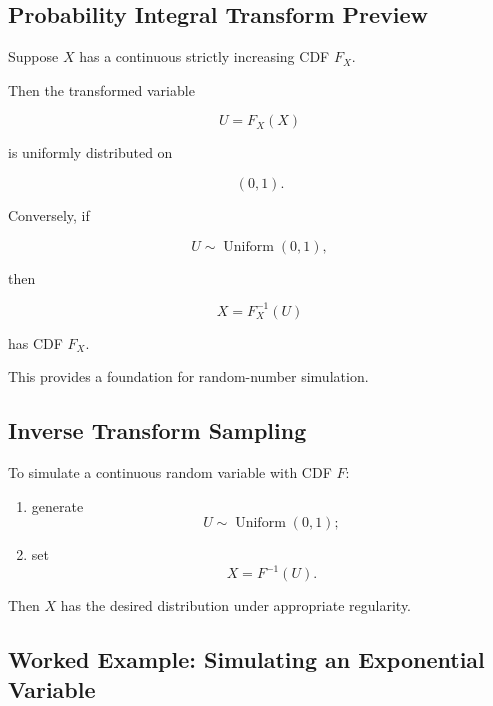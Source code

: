 \subsection{Probability Integral Transform Preview}
\label{subsec:probability-integral-transform-preview}

Suppose \(X\) has a continuous strictly increasing CDF \(F_X\).

Then the transformed variable

\[
\boxed{
U=F_X(X)
}
\]

is uniformly distributed on

\[
(0,1).
\]

Conversely, if

\[
U\sim\operatorname{Uniform}(0,1),
\]

then

\[
\boxed{
X=F_X^{-1}(U)
}
\]

has CDF \(F_X\).

This provides a foundation for random-number simulation.

\subsection{Inverse Transform Sampling}
\label{subsec:inverse-transform-sampling}

To simulate a continuous random variable with CDF \(F\):

\begin{enumerate}
    \item generate
    \[
    U\sim\operatorname{Uniform}(0,1);
    \]

    \item set
    \[
    X=F^{-1}(U).
    \]
\end{enumerate}

Then \(X\) has the desired distribution under appropriate regularity.

\subsection{Worked Example: Simulating an Exponential Variable}
\label{subsec:worked-inverse-exponential}

